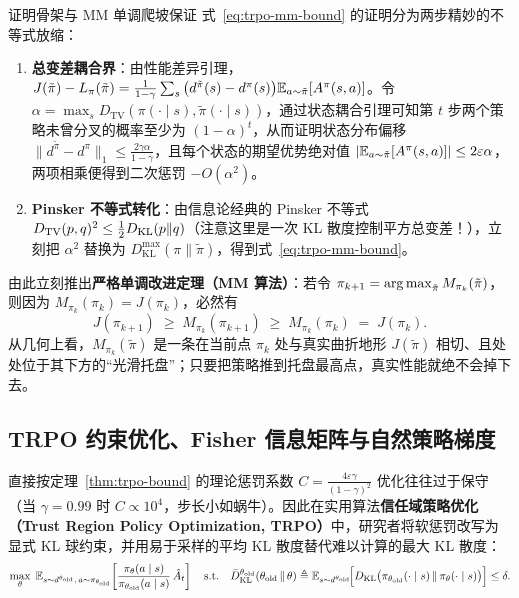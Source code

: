 \begin{insightBox}{证明骨架与 MM 单调爬坡保证}
式~\eqref{eq:trpo-mm-bound} 的证明分为两步精妙的不等式放缩：
\begin{enumerate}
  \item \textbf{总变差耦合界}：由性能差异引理，$J(\tilde{\pi}) - L_\pi(\tilde{\pi}) = \frac{1}{1-\gamma}\sum_s \big(d^{\tilde{\pi}}(s) - d^\pi(s)\big)\mathbb{E}_{a\sim\tilde{\pi}}[A^\pi(s,a)]$。令 $\alpha = \max_s D_{\mathrm{TV}}(\pi(\cdot\mid s), \tilde{\pi}(\cdot\mid s))$，通过状态耦合引理可知第 $t$ 步两个策略未曾分叉的概率至少为 $(1-\alpha)^t$，从而证明状态分布偏移 $\|d^{\tilde{\pi}} - d^\pi\|_1 \le \frac{2\gamma\alpha}{1-\gamma}$，且每个状态的期望优势绝对值 $|\mathbb{E}_{a\sim\tilde{\pi}}[A^\pi(s,a)]| \le 2\varepsilon \alpha$，两项相乘便得到二次惩罚 $-O(\alpha^2)$。
  \item \textbf{Pinsker 不等式转化}：由信息论经典的 Pinsker 不等式 $D_{\mathrm{TV}}(p, q)^2 \le \frac{1}{2}D_{\mathrm{KL}}(p \| q)$（注意这里是一次 KL 散度控制平方总变差！），立刻把 $\alpha^2$ 替换为 $D_{\mathrm{KL}}^{\max}(\pi \| \tilde{\pi})$，得到式~\eqref{eq:trpo-mm-bound}。
\end{enumerate}
由此立刻推出\textbf{严格单调改进定理（MM 算法）}：若令 $\pi_{k+1} = \operatorname*{arg\,max}_{\tilde{\pi}} M_{\pi_k}(\tilde{\pi})$，则因为 $M_{\pi_k}(\pi_k) = J(\pi_k)$，必然有
\[
  J(\pi_{k+1}) \;\ge\; M_{\pi_k}(\pi_{k+1}) \;\ge\; M_{\pi_k}(\pi_k) \;=\; J(\pi_k).
\]
从几何上看，$M_{\pi_k}(\tilde{\pi})$ 是一条在当前点 $\pi_k$ 处与真实曲折地形 $J(\tilde{\pi})$ 相切、且处处位于其下方的“光滑托盘”；只要把策略推到托盘最高点，真实性能就绝不会掉下去。
\end{insightBox}

\subsection{TRPO 约束优化、Fisher 信息矩阵与自然策略梯度}

直接按定理~\ref{thm:trpo-bound} 的理论惩罚系数 $C = \frac{4\varepsilon\gamma}{(1-\gamma)^2}$ 优化往往过于保守（当 $\gamma = 0.99$ 时 $C \propto 10^4$，步长小如蜗牛）。因此在实用算法\textbf{信任域策略优化（Trust Region Policy Optimization, TRPO）}中，研究者将软惩罚改写为显式 KL 球约束，并用易于采样的平均 KL 散度替代难以计算的最大 KL 散度：
\begin{equation}
  \max_\theta \; \mathbb{E}_{s \sim d^{\theta_{\mathrm{old}}},\, a \sim \pi_{\theta_{\mathrm{old}}}}\!\left[\frac{\pi_\theta(a \mid s)}{\pi_{\theta_{\mathrm{old}}}(a \mid s)}\,\hat{A}_t\right]
  \quad \text{s.t.} \quad
  \bar{D}_{\mathrm{KL}}^{\theta_{\mathrm{old}}}(\theta_{\mathrm{old}} \,\|\, \theta) \triangleq \mathbb{E}_{s \sim d^{\theta_{\mathrm{old}}}}\!\Big[D_{\mathrm{KL}}\big(\pi_{\theta_{\mathrm{old}}}(\cdot \mid s) \,\|\, \pi_\theta(\cdot \mid s)\big)\Big] \le \delta.
  \label{eq:trpo-opt}
\end{equation}

